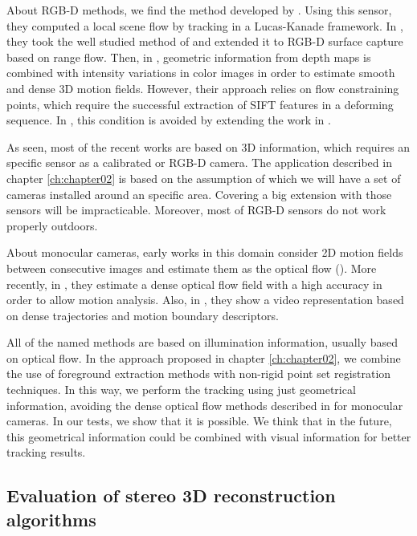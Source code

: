 About RGB-D methods, we find the method developed by \cite{quiroga2014local}. Using this sensor, they computed a local scene flow by tracking in a Lucas-Kanade framework. In \cite{spies2000dense}, they took the well studied method of \cite{horn1981determining} and extended it to RGB-D surface capture based on range flow. Then, in \cite{petit2011surface, letouzey2011scene}, geometric information from depth maps is combined with intensity variations in color images in order to estimate smooth and dense 3D motion fields. However, their approach relies on flow constraining points, which require the successful extraction of SIFT features in a deforming sequence. In \cite{birdal2012monocular}, this condition is avoided by extending the work in \cite{spies2000dense}. 

As seen, most of the recent works are based on 3D information, which requires an specific sensor as a calibrated or RGB-D camera. The application described in chapter \ref{ch:chapter02} is based on the assumption of which we will have a set of cameras installed around an specific area. Covering a big extension with those sensors will be impracticable. Moreover, most of RGB-D sensors do not work properly outdoors.

About monocular cameras, early works in this domain consider 2D motion fields between consecutive images and estimate them as the optical flow (\cite{birchfield1997derivation}). More recently, in \cite{brox2011large}, they estimate a dense optical flow field with a high accuracy in order to allow motion analysis. Also, in \cite{wang2013dense}, they show a video representation based on dense trajectories and motion boundary descriptors.

All of the named methods are based on illumination information, usually based on optical flow. In the approach proposed in chapter \ref{ch:chapter02}, we combine the use of foreground extraction methods with non-rigid point set registration techniques. In this way, we perform the tracking using just geometrical information, avoiding the dense optical flow methods described in \cite{brox2011large, wang2013dense} for monocular cameras. In our tests, we show that it is possible. We think that in the future, this geometrical information could be combined with visual information for better tracking results.

\subsection{Evaluation of stereo 3D reconstruction algorithms}\label{ch:chapter00_02_03}

